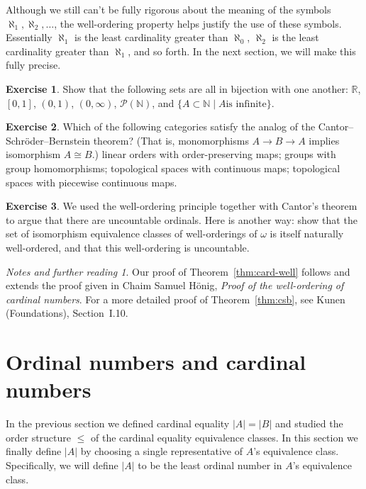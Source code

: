 \documentclass[11pt,oneside]{amsbook}
\newcommand{\N}{\mathbb N}
\newcommand{\R}{\mathbb R}
\theoremstyle{definition}
\newtheorem{exercise}{Exercise}[section]
\theoremstyle{plain}
\theoremstyle{definition}
\theoremstyle{remark}
\newtheorem*{notes}{Notes and further reading}
\numberwithin{equation}{section}
\numberwithin{figure}{section}
\begin{document}
Although we still can't be fully rigorous about the meaning of the symbols $\aleph_1,\aleph_2,\ldots$, the well-ordering property helps justify the use of these symbols. Essentially $\aleph_1$ is the least cardinality greater than $\aleph_0$, $\aleph_2$ is the least cardinality greater than $\aleph_1$, and so forth. In the next section, we will make this fully precise.

\begin{exercise}
  Show that the following sets are all in bijection with one another: $\R$, $[0,1]$, $(0,1)$, $(0,\infty)$, $\mathcal P(\N)$, and $\{A\subset\N\mid A\text{is infinite}\}$.
\end{exercise}

\begin{exercise}
  Which of the following categories satisfy the analog of the Cantor--Schr\"oder--Bernstein theorem? (That is, monomorphisms $A\to B\to A$ implies isomorphism $A\cong B$.) linear orders with order-preserving maps; groups with group homomorphisms; topological spaces with continuous maps; topological spaces with piecewise continuous maps.
\end{exercise}

\begin{exercise}
  We used the well-ordering principle together with Cantor's theorem to argue that there are uncountable ordinals. Here is another way: show that the set of isomorphism equivalence classes of well-orderings of $\omega$ is itself naturally well-ordered, and that this well-ordering is uncountable.
\end{exercise}

\begin{notes}
  Our proof of Theorem~\ref{thm:card-well} follows and extends the proof given in Chaim Samuel H\"onig, \emph{Proof of the well-ordering of cardinal numbers}. For a more detailed proof of Theorem~\ref{thm:csb}, see Kunen (Foundations), Section~I.10.
\end{notes}


\newpage
\section{Ordinal numbers and cardinal numbers}

In the previous section we defined cardinal equality $|A|=|B|$ and studied the order structure $\leq$ of the cardinal equality equivalence classes. In this section we finally define $|A|$ by choosing a single representative of $A$'s equivalence class. Specifically, we will define $|A|$ to be the least ordinal number in $A$'s equivalence class.
\end{document}
